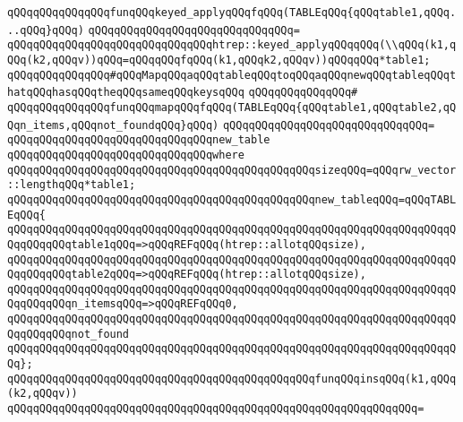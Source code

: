 \newline
\verb|qQQqqQQqqQQqqQQqfunqQQqkeyed_applyqQQqfqQQq(TABLEqQQq{qQQqtable1,qQQq...qQQq}qQQq)|\newline
\verb|qQQqqQQqqQQqqQQqqQQqqQQqqQQqqQQq=|\newline
\verb|qQQqqQQqqQQqqQQqqQQqqQQqqQQqqQQqhtrep::keyed_applyqQQqqQQq(\\qQQq(k1,qQQq(k2,qQQqv))qQQq=qQQqqQQqfqQQq(k1,qQQqk2,qQQqv))qQQqqQQq*table1;|\newline
\newline
\verb|qQQqqQQqqQQqqQQq#qQQqMapqQQqaqQQqtableqQQqtoqQQqaqQQqnewqQQqtableqQQqthatqQQqhasqQQqtheqQQqsameqQQqkeysqQQq|\newline
\verb|qQQqqQQqqQQqqQQq#|\newline
\verb|qQQqqQQqqQQqqQQqfunqQQqmapqQQqfqQQq(TABLEqQQq{qQQqtable1,qQQqtable2,qQQqn_items,qQQqnot_foundqQQq}qQQq)|\newline
\verb|qQQqqQQqqQQqqQQqqQQqqQQqqQQqqQQq=|\newline
\verb|qQQqqQQqqQQqqQQqqQQqqQQqqQQqqQQqnew_table|\newline
\verb|qQQqqQQqqQQqqQQqqQQqqQQqqQQqqQQqwhere|\newline
\verb|qQQqqQQqqQQqqQQqqQQqqQQqqQQqqQQqqQQqqQQqqQQqqQQqsizeqQQq=qQQqrw_vector::lengthqQQq*table1;|\newline
\newline
\verb|qQQqqQQqqQQqqQQqqQQqqQQqqQQqqQQqqQQqqQQqqQQqqQQqnew_tableqQQq=qQQqTABLEqQQq{|\newline
\verb|qQQqqQQqqQQqqQQqqQQqqQQqqQQqqQQqqQQqqQQqqQQqqQQqqQQqqQQqqQQqqQQqqQQqqQQqqQQqqQQqtable1qQQq=>qQQqREFqQQq(htrep::allotqQQqsize),|\newline
\verb|qQQqqQQqqQQqqQQqqQQqqQQqqQQqqQQqqQQqqQQqqQQqqQQqqQQqqQQqqQQqqQQqqQQqqQQqqQQqqQQqtable2qQQq=>qQQqREFqQQq(htrep::allotqQQqsize),|\newline
\verb|qQQqqQQqqQQqqQQqqQQqqQQqqQQqqQQqqQQqqQQqqQQqqQQqqQQqqQQqqQQqqQQqqQQqqQQqqQQqqQQqn_itemsqQQq=>qQQqREFqQQq0,|\newline
\verb|qQQqqQQqqQQqqQQqqQQqqQQqqQQqqQQqqQQqqQQqqQQqqQQqqQQqqQQqqQQqqQQqqQQqqQQqqQQqqQQqnot_found|\newline
\verb|qQQqqQQqqQQqqQQqqQQqqQQqqQQqqQQqqQQqqQQqqQQqqQQqqQQqqQQqqQQqqQQqqQQqqQQq};|\newline
\newline
\verb|qQQqqQQqqQQqqQQqqQQqqQQqqQQqqQQqqQQqqQQqqQQqqQQqfunqQQqinsqQQq(k1,qQQq(k2,qQQqv))|\newline
\verb|qQQqqQQqqQQqqQQqqQQqqQQqqQQqqQQqqQQqqQQqqQQqqQQqqQQqqQQqqQQqqQQq=|\newline
